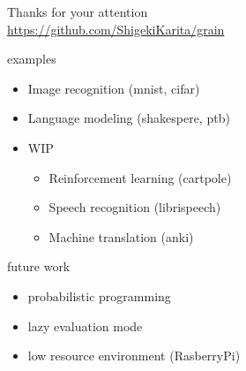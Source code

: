 \documentclass[aspectratio=169,
  14pt,xcolor=dvipsnames,table,professional font,dvipdfmx]{beamer}
\begin{document}
{\begin{frame}{}
  \vspace*{10em}
    \begin{center}
      \large
      Thanks for your attention
      \\
      \alert{\url{https://github.com/ShigekiKarita/grain}}
    \end{center}
\end{frame}
}

\begin{frame}{examples}
  \begin{itemize}
  \item Image recognition (mnist, cifar)
  \item Language modeling (shakespere, ptb)
  \item WIP
  \begin{itemize}
  \item Reinforcement learning (cartpole)
  \item Speech recognition (librispeech)
  \item Machine translation (anki)
  \end{itemize}
  \end{itemize}
\end{frame}

\begin{frame}{future work}
  \begin{itemize}
  \item probabilistic programming
  \item lazy evaluation mode
  \item low resource environment (RasberryPi)
  \end{itemize}
\end{frame}

	
\end{document}
